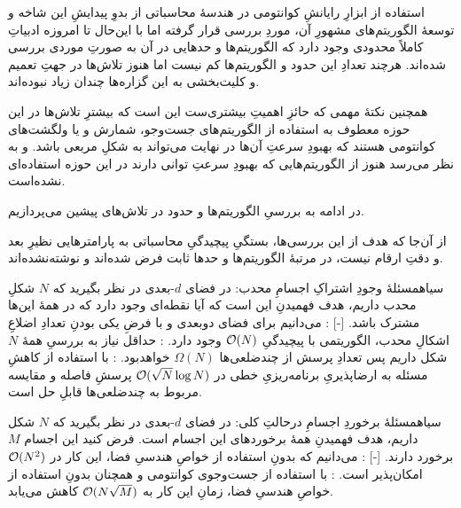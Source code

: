 

استفاده از ابزارِ رایانشِ کوانتومی در هندسهٔ محاسباتی از بدوِ پیدایشِ این شاخه و توسعهٔ الگوریتم‌های مشهورِ آن، موردِ بررسی قرار گرفته  اما با این‌حال تا امروزه ادبیاتِ کاملاً محدودی وجود دارد که الگوریتم‌ها و حدهایی در آن به صورتِ‌ موردی بررسی شده‌اند. هرچند تعدادِ این حدود و الگوریتم‌ها کم نیست اما هنوز تلاش‌ها در جهتِ تعمیم و کلیت‌بخشی به این گزاره‌ها چندان زیاد نبوده‌اند.

همچنین نکتهٔ مهمی که حائزِ اهمیتِ بیشتری‌ست این است که بیشترِ تلاش‌ها در این حوزه معطوف به استفاده از الگوریتم‌های جست‌وجو، شمارش و یا ولگشت‌های کوانتومی هستند که بهبودِ سرعتِ آن‌ها در نهایت می‌تواند به شکلِ مربعی باشد. و به نظر می‌رسد هنوز از الگوریتم‌هایی که بهبودِ سرعتِ توانی
 دارند در این حوزه استفاده‌ای نشده‌است. 

در ادامه به بررسیِ الگوریتم‌ها و حدود در تلاش‌های پیشین می‌پردازیم.

از آن‌جا که هدف از این بررسی‌ها، بستگیِ پیچیدگیِ محاسباتی به پارامترهایی نظیرِ بعد و دقتِ ارقام نیست، در مرتبهٔ الگوریتم‌ها و حدها ثابت فرض شده‌اند و نوشته‌نشده‌اند.

‌سیاه{مسئلهٔ وجودِ اشتراکِ اجسامِ محدب}: در فضای $d$-بعدی در نظر بگیرید که $N$ شکلِ محدب داریم، هدف فهمیدنِ این است که آیا نقطه‌ای وجود دارد که در همهٔ این‌ها مشترک باشد. 
[-]
    : می‌دانیم برای فضای دوبعدی و با فرضِ یکی بودنِ تعدادِ اضلاعِ اشکالِ محدب، الگوریتمی با پیچیدگیِ
    $\mathcal{O}(N)$
    وجود دارد.
    : حداقل نیاز به بررسیِ همهٔ $N$ شکل داریم پس تعدادِ پرسش از چندضلعی‌ها 
    $\Omega(N)$
    خواهدبود.
    : با استفاده از کاهشِ مسئله به ارضاپذیریِ برنامه‌ریزیِ خطی در 
    $\mathcal{O}(\sqrt{N}\log N)$
    پرسشِ فاصله و مقایسه مربوط به چندضلعی‌ها قابلِ حل است.

‌سیاه{مسئلهٔ برخوردِ اجسامِ درحالتِ کلی}:
 در فضای $d$-بعدی در نظر بگیرید که $N$ شکل داریم، هدف فهمیدنِ همهٔ برخوردهای این اجسام است. فرض کنید این اجسام $M$ برخورد دارند. 
[-]
    : می‌دانیم که بدونِ استفاده از خواصِ هندسیِ فضا، این کار در 
    $\mathcal{O}(N^2)$
    امکان‌پذیر است.
    : با استفاده از جست‌وجوی کوانتومی و همچنان بدونِ استفاده از خواصِ هندسیِ فضا، زمانِ این کار به 
    $\mathcal{O}(N\sqrt{M})$
    کاهش می‌یابد.

